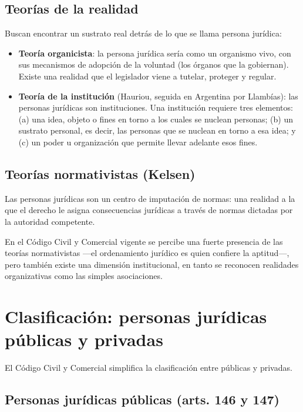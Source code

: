 \documentclass[12pt,oneside]{book}
\begin{document}
\subsection{Teorías de la realidad}

Buscan encontrar un sustrato real detrás de lo que se llama persona jurídica:

\begin{itemize}
    \item \textbf{Teoría organicista}: la persona jurídica sería como un organismo vivo, con sus mecanismos de adopción de la voluntad (los órganos que la gobiernan). Existe una realidad que el legislador viene a tutelar, proteger y regular.
    \item \textbf{Teoría de la institución} (Hauriou, seguida en Argentina por Llambías): las personas jurídicas son instituciones. Una institución requiere tres elementos: (a) una idea, objeto o fines en torno a los cuales se nuclean personas; (b) un sustrato personal, es decir, las personas que se nuclean en torno a esa idea; y (c) un poder u organización que permite llevar adelante esos fines.
\end{itemize}

\subsection{Teorías normativistas (Kelsen)}

Las personas jurídicas son un centro de imputación de normas: una realidad a la que el derecho le asigna consecuencias jurídicas a través de normas dictadas por la autoridad competente.

\begin{note}
En el Código Civil y Comercial vigente se percibe una fuerte presencia de las teorías normativistas —el ordenamiento jurídico es quien confiere la aptitud—, pero también existe una dimensión institucional, en tanto se reconocen realidades organizativas como las simples asociaciones.
\end{note}

\section{Clasificación: personas jurídicas públicas y privadas}

El Código Civil y Comercial simplifica la clasificación entre públicas y privadas.

\subsection{Personas jurídicas públicas (arts. 146 y 147)}
\end{document}
